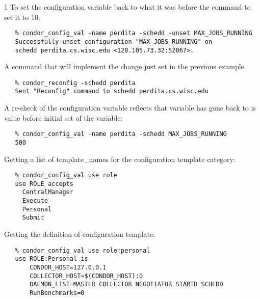 \begin{ManPage}{\label{man-condor-config-val}}{1}
To set the configuration variable 
back to what it was before the command to set it to 10:
\footnotesize
\begin{verbatim}
   % condor_config_val -name perdita -schedd -unset MAX_JOBS_RUNNING
   Successfully unset configuration "MAX_JOBS_RUNNING" on 
   schedd perdita.cs.wisc.edu <128.105.73.32:52067>.
\end{verbatim}
\normalsize

A command that will implement the change just set in the previous
example.
\footnotesize
\begin{verbatim}
   % condor_reconfig -schedd perdita
   Sent "Reconfig" command to schedd perdita.cs.wisc.edu
\end{verbatim}
\normalsize

A re-check of the configuration variable reflects that variable
has gone back to is value before initial set of the variable:
\footnotesize
\begin{verbatim}
   % condor_config_val -name perdita -schedd MAX_JOBS_RUNNING
   500
\end{verbatim}
\normalsize

Getting a list of template\_names for the  configuration
template category:
\footnotesize
\begin{verbatim}
   % condor_config_val use role
   use ROLE accepts
     CentralManager
     Execute
     Personal
     Submit
\end{verbatim}
\normalsize

Getting the definition of  configuration template:
\footnotesize
\begin{verbatim}
   % condor_config_val use role:personal
   use ROLE:Personal is
   	   CONDOR_HOST=127.0.0.1
	   COLLECTOR_HOST=$(CONDOR_HOST):0
	   DAEMON_LIST=MASTER COLLECTOR NEGOTIATOR STARTD SCHEDD
	   RunBenchmarks=0
\end{verbatim}
\normalsize

\end{ManPage}
